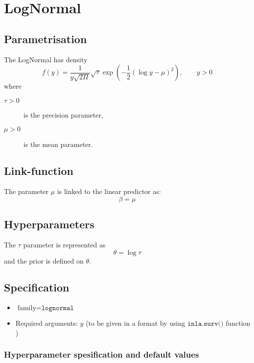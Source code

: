 \documentclass[a4paper,11pt]{article}
\begin{document}
\section*{LogNormal}

\subsection*{Parametrisation}

The LogNormal has density
\begin{displaymath}
    f(y) = \frac{1}{y\sqrt{2\Pi}} \sqrt{\tau} \exp\left(
      -\frac{1}{2} (\log y - \mu)^{2}
    \right), \qquad y > 0
\end{displaymath}
where
\begin{description}
\item[$\tau > 0$] is the precision parameter,
\item[$\mu > 0$] is the mean parameter.
\end{description}

\subsection*{Link-function}

The parameter $\mu$ is linked to the linear predictor as:
\[
\beta = \mu
\]
\subsection*{Hyperparameters}

The $\tau$ parameter is represented as
\[
\theta = \log\tau
\]
and the prior is defined on $\theta$.

\subsection*{Specification}

\begin{itemize}
\item $\text{family}=\texttt{lognormal}$
\item Required arguments: $y$ (to be given in a format by using
    $\texttt{inla.surv()}$ function )
\end{itemize}

\subsubsection*{Hyperparameter spesification and default values}

\end{document}
